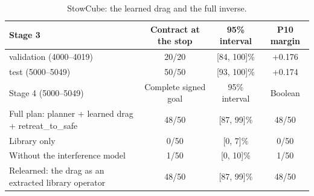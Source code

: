 \begin{table}[t]
\centering
\footnotesize
\caption{StowCube: the learned drag and the full inverse.}
\label{tab:stow-round2}
\begin{tabular}{@{}lccc@{}}
\toprule
Stage 3 & Contract at the stop & 95\% interval & P10 margin \\
\midrule
validation (4000--4019) & 20/20 & [84, 100]\% & +0.176 \\
test (5000--5049) & 50/50 & [93, 100]\% & +0.174 \\
\midrule
Stage 4 (5000--5049) & Complete signed goal & 95\% interval & Boolean \\
\midrule
Full plan: planner + learned drag + retreat\_to\_safe & 48/50 & [87, 99]\% & 48/50 \\
Library only & 0/50 & [0, 7]\% & 0/50 \\
Without the interference model & 1/50 & [0, 10]\% & 1/50 \\
Relearned: the drag as an extracted library operator & 48/50 & [87, 99]\% & 48/50 \\
\bottomrule
\end{tabular}
\end{table}
